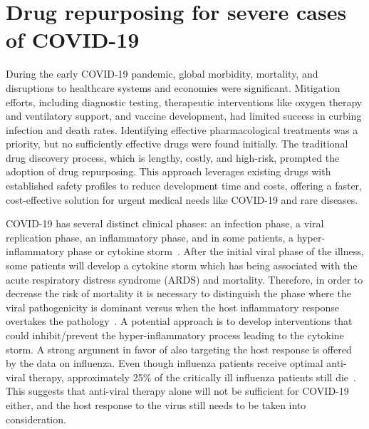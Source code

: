 \newcommand*{\MyIndent}{\hspace*{0.5cm}}

\section{Drug repurposing for severe cases of COVID-19}
\label{chap:COVID_Study}

During the early COVID-19 pandemic, global morbidity, mortality, and disruptions to healthcare systems and economies were significant. Mitigation efforts, including diagnostic testing, therapeutic interventions like oxygen therapy and ventilatory support, and vaccine development, had limited success in curbing infection and death rates. Identifying effective pharmacological treatments was a priority, but no sufficiently effective drugs were found initially. The traditional drug discovery process, which is lengthy, costly, and high-risk, prompted the adoption of drug repurposing. This approach leverages existing drugs with established safety profiles to reduce development time and costs, offering a faster, cost-effective solution for urgent medical needs like COVID-19 and rare diseases.


COVID-19 has several distinct clinical phases:  an infection phase, a viral replication phase, an inflammatory phase, and in some patients, a hyper-inflammatory phase or cytokine storm~\cite{siddiqi2020covid,Ayres2020:survivingCOVID19}. After the initial viral phase of the illness, some patients will develop a cytokine storm which has being associated with the acute respiratory distress syndrome (ARDS) and mortality.  Therefore, in order to decrease the risk of mortality it is necessary to distinguish the phase where the viral pathogenicity is dominant versus when the host inflammatory response overtakes the pathology~\cite{siddiqi2020covid,Ayres2020:survivingCOVID19}. A potential approach is to develop interventions that could inhibit/prevent the hyper-inflammatory process leading to the cytokine storm.
A strong argument in favor of also targeting the host response is offered by the data on influenza. Even though influenza patients receive optimal anti-viral therapy, approximately 25\% of the critically ill influenza patients still die~\cite{Ayres2020:survivingCOVID19,louie2012treatment}. This suggests that anti-viral therapy alone will not be sufficient for COVID-19 either, and the host response to the virus still needs to be taken into consideration.

